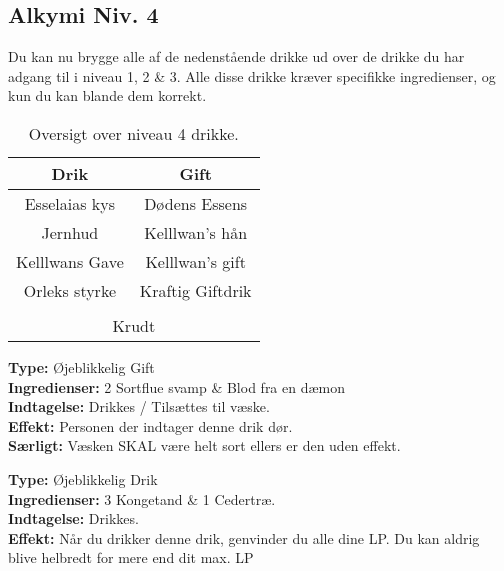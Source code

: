 \subsection{Alkymi Niv. 4}
Du kan nu brygge alle af de nedenstående drikke ud over de drikke du har adgang til i niveau 1, 2 \& 3. Alle disse drikke kræver specifikke ingredienser, og kun du kan blande dem korrekt.\\

\begin{table}[H]
    \centering
    \begin{tabular}{|c|c|}
        \rowcolor{cerulean!80}\hline
        Drik & Gift \\\hline
        Esselaias kys & Dødens Essens \\\hline
        Jernhud & Kelllwan’s hån \\\hline
        Kelllwans Gave & Kelllwan’s gift \\\hline
        Orleks styrke & Kraftig Giftdrik \\\hline
        \rowcolor{cerulean!80}\hline
        \multicolumn{2}{|c|}{Speciel} \\\hline
        \multicolumn{2}{|c|}{Krudt} \\\hline
    \end{tabular}
    \caption{Oversigt over niveau 4 drikke.}
\end{table}

\begin{gift*}
\textbf{Type:} Øjeblikkelig Gift\\
\textbf{Ingredienser:} 2 Sortflue svamp \& Blod fra en dæmon\\
\textbf{Indtagelse:} Drikkes / Tilsættes til væske.\\
\textbf{Effekt:} Personen der indtager denne drik dør.\\
\textbf{Særligt:} Væsken SKAL være helt sort ellers er den uden effekt.\\
\end{gift*}

\begin{drik*}
\textbf{Type:} Øjeblikkelig Drik\\
\textbf{Ingredienser:} 3 Kongetand \& 1 Cedertræ.\\
\textbf{Indtagelse:} Drikkes.\\
\textbf{Effekt:} Når du drikker denne drik, genvinder du alle dine LP.  Du kan aldrig blive helbredt for mere end dit max. LP
\end{drik*}


